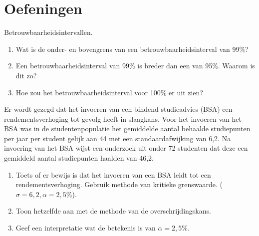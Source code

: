 \section{Oefeningen}
\label{sec:toetsingsprocedures-oefeningen}

\begin{exercise}
  Betrouwbaarheidsintervallen.
  
  \begin{enumerate}
    \item Wat is de onder- en bovengrens van een betrouwbaarheidsinterval van 99\%?
    \item Een betrouwbaarheidsinterval van 99\% is breder dan een van 95\%. Waarom is dit zo?
    \item Hoe zou het betrouwbaarheidsinterval voor 100\% er uit zien?
  \end{enumerate}
  
\end{exercise}

\begin{exercise}
  \label{oef:bindend-studieadvies}
  
  Er wordt gezegd dat het invoeren van een bindend studieadvies (BSA) een rendementsverhoging tot gevolg heeft in slaagkans. Voor het invoeren van het BSA was in de studentenpopulatie het gemiddelde aantal behaalde studiepunten per jaar per student gelijk aan 44 met een standaardafwijking van 6,2. Na invoering van het BSA wijst een onderzoek uit onder 72 studenten dat deze een gemiddeld aantal studiepunten haalden van 46,2.
  
  \begin{enumerate}
    \item Toets of er bewijs is dat het invoeren van een BSA leidt tot een rendementsverhoging. Gebruik methode van kritieke grenswaarde. ($\sigma = 6,2, \alpha = 2,5\%$).
    \item Toon hetzelfde aan met de methode van de overschrijdingskans.
    \item Geef een interpretatie wat de betekenis is van $\alpha = 2,5 \%$.
  \end{enumerate}
\end{exercise}

